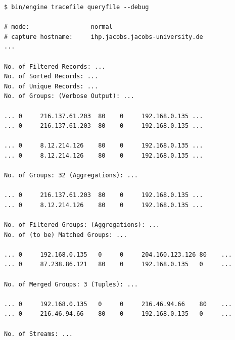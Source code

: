 
\begin{lstlisting}
$ bin/engine tracefile queryfile --debug

# mode:                 normal
# capture hostname:     ihp.jacobs.jacobs-university.de
...

No. of Filtered Records: ...
No. of Sorted Records: ...
No. of Unique Records: ...
No. of Groups: (Verbose Output): ...

... 0     216.137.61.203  80    0     192.168.0.135 ...
... 0     216.137.61.203  80    0     192.168.0.135 ...

... 0     8.12.214.126    80    0     192.168.0.135 ...
... 0     8.12.214.126    80    0     192.168.0.135 ...

No. of Groups: 32 (Aggregations): ...

... 0     216.137.61.203  80    0     192.168.0.135 ...
... 0     8.12.214.126    80    0     192.168.0.135 ...

No. of Filtered Groups: (Aggregations): ...
No. of (to be) Matched Groups: ...

... 0     192.168.0.135   0     0     204.160.123.126 80    ...
... 0     87.238.86.121   80    0     192.168.0.135   0     ...

No. of Merged Groups: 3 (Tuples): ...

... 0     192.168.0.135   0     0     216.46.94.66    80    ...
... 0     216.46.94.66    80    0     192.168.0.135   0     ...

No. of Streams: ...
\end{lstlisting}

